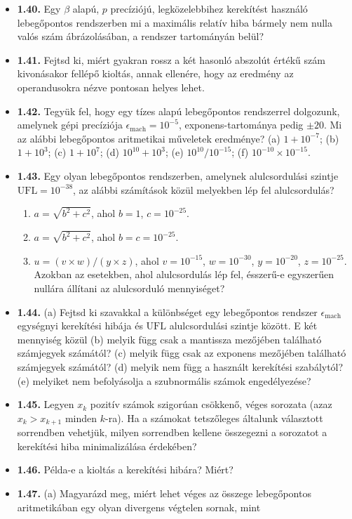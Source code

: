 \documentclass[
  magyar,
  11pt]{article}
\providecommand{\tightlist}{%
  \setlength{\itemsep}{0pt}\setlength{\parskip}{0pt}}
\begin{document}
\begin{itemize}
  értékek mindegyikét előállítják.
\item
  \textbf{1.40.} Egy \(\beta\) alapú, \(p\) precíziójú, legközelebbihez
  kerekítést használó lebegőpontos rendszerben mi a maximális relatív
  hiba bármely nem nulla valós szám ábrázolásában, a rendszer
  tartományán belül?
\item
  \textbf{1.41.} Fejtsd ki, miért gyakran rossz a két hasonló abszolút
  értékű szám kivonásakor fellépő kioltás, annak ellenére, hogy az
  eredmény az operandusokra nézve pontosan helyes lehet.
\item
  \textbf{1.42.} Tegyük fel, hogy egy tízes alapú lebegőpontos
  rendszerrel dolgozunk, amelynek gépi precíziója
  \(\epsilon_{\text{mach}} = 10^{-5}\), exponens-tartománya pedig
  \(\pm 20\). Mi az alábbi lebegőpontos aritmetikai műveletek eredménye?
  (a) \(1 + 10^{-7}\); (b) \(1 + 10^{3}\); (c) \(1 + 10^{7}\); (d)
  \(10^{10} + 10^{3}\); (e) \(10^{10} / 10^{-15}\); (f)
  \(10^{-10} \times 10^{-15}\).
\item
  \textbf{1.43.} Egy olyan lebegőpontos rendszerben, amelynek
  alulcsordulási szintje \(\text{UFL} = 10^{-38}\), az alábbi számítások
  közül melyekben lép fel alulcsordulás?

  \begin{enumerate}
  \def\labelenumi{(\alph{enumi})}
  \tightlist
  \item
    \(a = \sqrt{b^2 + c^2}\), ahol \(b = 1\), \(c = 10^{-25}\).
  \item
    \(a = \sqrt{b^2 + c^2}\), ahol \(b = c = 10^{-25}\).
  \item
    \(u = (v \times w)/(y \times z)\), ahol \(v = 10^{-15}\),
    \(w = 10^{-30}\), \(y = 10^{-20}\), \(z = 10^{-25}\). Azokban az
    esetekben, ahol alulcsordulás lép fel, ésszerű-e egyszerűen nullára
    állítani az alulcsorduló mennyiséget?
  \end{enumerate}
\item
  \textbf{1.44.} (a) Fejtsd ki szavakkal a különbséget egy lebegőpontos
  rendszer \(\epsilon_{\text{mach}}\) egységnyi kerekítési hibája és
  \(\text{UFL}\) alulcsordulási szintje között. E két mennyiség közül
  (b) melyik függ csak a mantissza mezőjében található számjegyek
  számától? (c) melyik függ csak az exponens mezőjében található
  számjegyek számától? (d) melyik nem függ a használt kerekítési
  szabálytól? (e) melyiket nem befolyásolja a szubnormális számok
  engedélyezése?
\item
  \textbf{1.45.} Legyen \(x_k\) pozitív számok szigorúan csökkenő, véges
  sorozata (azaz \(x_k > x_{k+1}\) minden \(k\)-ra). Ha a számokat
  tetszőleges általunk választott sorrendben vehetjük, milyen sorrendben
  kellene összegezni a sorozatot a kerekítési hiba minimalizálása
  érdekében?
\item
  \textbf{1.46.} Példa-e a kioltás a kerekítési hibára? Miért?
\item
  \textbf{1.47.} (a) Magyarázd meg, miért lehet véges az összege
  lebegőpontos aritmetikában egy olyan divergens végtelen sornak, mint
\end{itemize}
\end{document}
